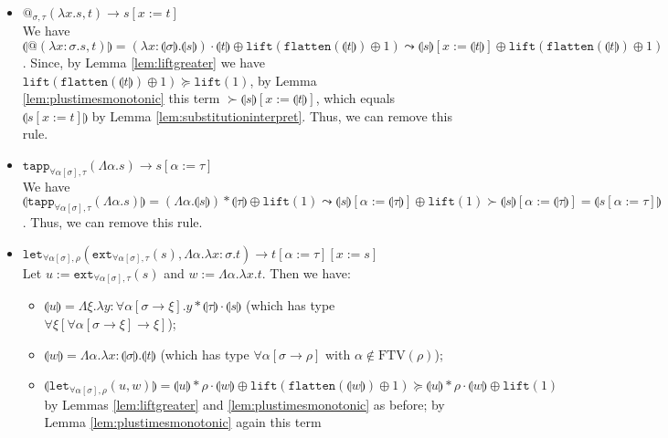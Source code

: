 \documentclass[runningheads,a4paper]{llncs}
\newcommand{\quant}[2]{\forall #1[#2]}
\newcommand{\qquant}[3]{#1 #2[#3]}
\newcommand{\typeinterpret}[1]{\llparenthesis #1 \rrparenthesis}
\newcommand{\interpret}[1]{\llparenthesis #1 \rrparenthesis}
\newcommand{\red}{\longrightarrow}
\newcommand{\arrtype}{\rightarrow}
\newcommand{\abs}[2]{\lambda #1.#2}
\newcommand{\tabs}[2]{\Lambda #1.#2}
\newcommand{\FTV}{\mathrm{FTV}}
\newcommand{\flatten}{\mathtt{flatten}}
\newcommand{\lift}{\mathtt{lift}}
\begin{document}
\begin{itemize}
\item $@_{\sigma,\tau}(\abs{x}{s},t) \red s[x:=t]$ \\
  We have $\interpret{@(\abs{x:\sigma}{s},t)} = (\abs{x:\typeinterpret{
  \sigma}}{\interpret{s}}) \cdot \interpret{t} \oplus \lift(\flatten(
  \interpret{t}) \oplus 1) \leadsto \interpret{s}[x:=\interpret{t}]
  \oplus \lift(\flatten(\interpret{t}) \oplus 1)$.  Since, by Lemma
  \ref{lem:liftgreater} we have $\lift(\flatten(\interpret{t}) \oplus
  1) \succeq \lift(1)$, by Lemma \ref{lem:plustimesmonotonic} this term
  $\succ \interpret{s}[x:=\interpret{t}]$, which equals
  $\interpret{s[x:=t]}$ by Lemma \ref{lem:substitutioninterpret}.
  Thus, we can remove this rule.
\item $\mathtt{tapp}_{\quant{\alpha}{\sigma},\tau}(\tabs{\alpha}{s})
  \red s[\alpha:=\tau]$ \\ We have
  $\interpret{\mathtt{tapp}_{\quant{\alpha}{\sigma},
      \tau}(\tabs{\alpha}{s})} = (\tabs{\alpha}{\interpret{s}}) *
  \typeinterpret{\tau} \oplus \lift(1) \leadsto \interpret{s}[\alpha:=
    \typeinterpret{\tau}] \oplus \lift(1) \succ
  \interpret{s}[\alpha:=\typeinterpret{\tau}] =
  \interpret{s[\alpha:=\tau]}$.  Thus, we can remove this rule.
\item $\mathtt{let}_{\qquant{\forall}{\alpha}{\sigma},\rho}(
  \mathtt{ext}_{\qquant{\forall}{\alpha}{\sigma},\tau}(s),\tabs{\alpha}{
    \abs{x:\sigma}{t}}) \red t[\alpha:=\tau][x:=s]$ \\
  Let $u := \mathtt{ext}_{\quant{\alpha}{\sigma},\tau}(s)$ and
  $w := \tabs{\alpha}{\abs{x}{t}}$.  Then we have:
  \begin{itemize}
  \item $\interpret{u} =
    \tabs{\xi}{\abs{y:\quant{\alpha}{\sigma \arrtype \xi}}{
    y * \typeinterpret{\tau} \cdot \interpret{s}}}$ (which has type
    $\quant{\xi}{\quant{\alpha}{\sigma \arrtype \xi} \arrtype \xi}$);
  \item $\interpret{w} = \tabs{\alpha}{\abs{x:\typeinterpret{\sigma}}{
    \interpret{t}}}$ (which has type $\quant{\alpha}{\sigma \arrtype
    \rho}$ with $\alpha \notin \FTV(\rho)$);
  \item $\interpret{\mathtt{let}_{\quant{\alpha}{\sigma},\rho}(u,w)} =
    \interpret{u} * \rho \cdot \interpret{w} \oplus
    \lift(\flatten(\interpret{w})\oplus 1) \succeq
    \interpret{u} * \rho \cdot \interpret{w} \oplus \lift(1)$ by
    Lemmas \ref{lem:liftgreater} and \ref{lem:plustimesmonotonic} as
    before; by Lemma \ref{lem:plustimesmonotonic} again this term

\end{itemize}
\end{itemize}
\end{document}
